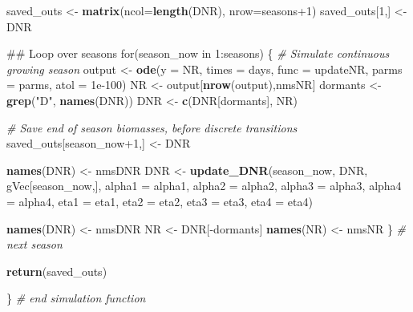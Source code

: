 \documentclass[11pt,]{article}
\newenvironment{Shaded}{\begin{snugshade}}{\end{snugshade}}
\newcommand{\KeywordTok}[1]{\textcolor[rgb]{0.13,0.29,0.53}{\textbf{{#1}}}}
\newcommand{\DataTypeTok}[1]{\textcolor[rgb]{0.13,0.29,0.53}{{#1}}}
\newcommand{\DecValTok}[1]{\textcolor[rgb]{0.00,0.00,0.81}{{#1}}}
\newcommand{\FloatTok}[1]{\textcolor[rgb]{0.00,0.00,0.81}{{#1}}}
\newcommand{\StringTok}[1]{\textcolor[rgb]{0.31,0.60,0.02}{{#1}}}
\newcommand{\CommentTok}[1]{\textcolor[rgb]{0.56,0.35,0.01}{\textit{{#1}}}}
\newcommand{\NormalTok}[1]{{#1}}
\begin{document}
\begin{Shaded}
\begin{Highlighting}[]
  \NormalTok{saved_outs     <-}\StringTok{ }\KeywordTok{matrix}\NormalTok{(}\DataTypeTok{ncol=}\KeywordTok{length}\NormalTok{(DNR), }\DataTypeTok{nrow=}\NormalTok{seasons}\DecValTok{+1}\NormalTok{)}
  \NormalTok{saved_outs[}\DecValTok{1}\NormalTok{,] <-}\StringTok{ }\NormalTok{DNR }

  \NormalTok{##  Loop over seasons}
  \NormalTok{for(season_now in }\DecValTok{1}\NormalTok{:seasons) \{}
    \CommentTok{# Simulate continuous growing  season}
    \NormalTok{output   <-}\StringTok{ }\KeywordTok{ode}\NormalTok{(}\DataTypeTok{y =} \NormalTok{NR, }\DataTypeTok{times =} \NormalTok{days, }\DataTypeTok{func =} \NormalTok{updateNR, }\DataTypeTok{parms =} \NormalTok{parms, }\DataTypeTok{atol =} \FloatTok{1e-100}\NormalTok{)}
    \NormalTok{NR       <-}\StringTok{ }\NormalTok{output[}\KeywordTok{nrow}\NormalTok{(output),nmsNR]}
    \NormalTok{dormants <-}\StringTok{ }\KeywordTok{grep}\NormalTok{(}\StringTok{"D"}\NormalTok{, }\KeywordTok{names}\NormalTok{(DNR)) }
    \NormalTok{DNR      <-}\StringTok{ }\KeywordTok{c}\NormalTok{(DNR[dormants], NR)}
    
    \CommentTok{# Save end of season biomasses, before discrete transitions}
    \NormalTok{saved_outs[season_now}\DecValTok{+1}\NormalTok{,] <-}\StringTok{ }\NormalTok{DNR}
    
    \KeywordTok{names}\NormalTok{(DNR) <-}\StringTok{ }\NormalTok{nmsDNR}
    \NormalTok{DNR        <-}\StringTok{ }\KeywordTok{update_DNR}\NormalTok{(season_now, DNR, gVec[season_now,],}
                             \DataTypeTok{alpha1 =} \NormalTok{alpha1, }\DataTypeTok{alpha2 =} \NormalTok{alpha2, }
                             \DataTypeTok{alpha3 =} \NormalTok{alpha3, }\DataTypeTok{alpha4 =} \NormalTok{alpha4,}
                             \DataTypeTok{eta1 =} \NormalTok{eta1, }\DataTypeTok{eta2 =} \NormalTok{eta2, }\DataTypeTok{eta3 =} \NormalTok{eta3, }\DataTypeTok{eta4 =} \NormalTok{eta4)}
    
    \KeywordTok{names}\NormalTok{(DNR) <-}\StringTok{ }\NormalTok{nmsDNR}
    \NormalTok{NR         <-}\StringTok{ }\NormalTok{DNR[-dormants]  }
    \KeywordTok{names}\NormalTok{(NR)  <-}\StringTok{ }\NormalTok{nmsNR}
  \NormalTok{\} }\CommentTok{# next season}
  
  \KeywordTok{return}\NormalTok{(saved_outs)}
  
\NormalTok{\} }\CommentTok{# end simulation function}
\end{Highlighting}
\end{Shaded}
\end{document}
